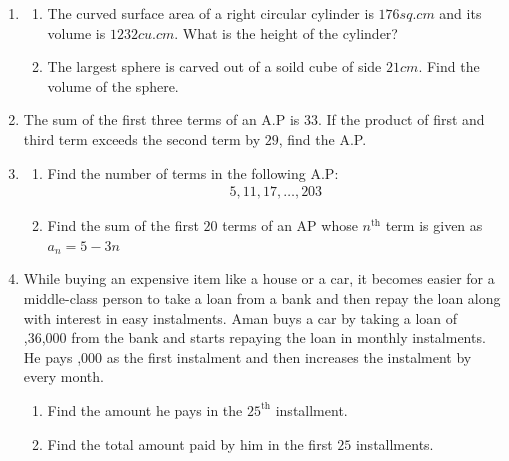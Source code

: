 \documentclass{article}
\begin{document}
\begin{enumerate}
        \item
        \begin{enumerate}
            \item The curved surface area of a right circular cylinder is $176 sq.cm$ and its volume is $1232cu. cm$. What is the height of the cylinder?
            
        \item The largest sphere is carved out of a soild cube of side $21 cm$. Find the volume of the sphere.
        \end{enumerate}
        \item The sum of the first three terms of an A.P is $33$. If the product of first and third term exceeds the second term by $29$, find the A.P.
            
         \item
        \begin{enumerate}
            \item Find the number of terms in the following A.P:
            \begin{align}
                5,11,17,\dots,203
            \end{align}
 \item Find the sum of the first $20$ terms of an AP whose $n^{\text{th}}$ term is given as $a_n=5-3n$
        \end{enumerate}

        \item While buying an expensive item like a house or a car, it becomes easier for a middle-class person to take a loan from a bank and then repay the loan along with interest in easy instalments. 
          Aman buys a car by taking a loan of ,36,000 from the bank and starts repaying the loan in monthly instalments. He pays ,000 as the first instalment and then increases the instalment by  every month. 
        \begin{enumerate}
        \item Find the amount he pays in the $25^{\text{th}}$ installment.
\item Find the total amount paid by him in the first $25$ installments.
    \end{enumerate} 
       
        \end{enumerate}
\end{document}
